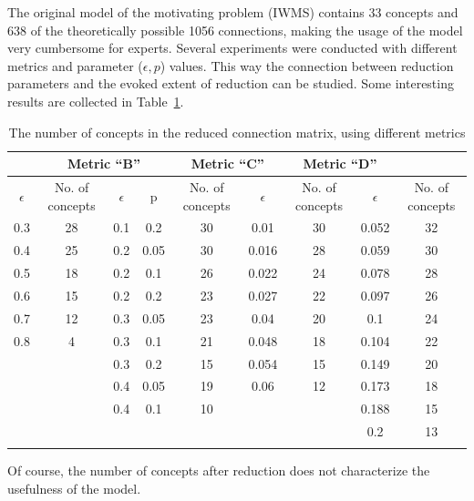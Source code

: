 \documentclass[graybox]{svmult}
\begin{document}
The original model of the motivating problem (IWMS) contains 33 
concepts and 638 of the theoretically possible 1056 connections, making 
the usage of the model very cumbersome for experts. Several experiments 
were conducted with different metrics and parameter ($\epsilon, p$) 
values. This way the connection between reduction parameters and the 
evoked extent of reduction can be studied. Some interesting results are 
collected in Table~\ref{tab:reductionResults}.

\begin{table}[!t]
\caption{The number of concepts in the reduced connection matrix, using different 
metrics \cite{hatwagnerm.f.koczyl.t.2015}}
\label{tab:reductionResults}
\centering
\begin{tabular}{ccccccccc}
\hline\noalign{\smallskip}
\multicolumn{2}{c}{Metric ``A''} &
  \multicolumn{3}{c}{Metric ``B''} &
  \multicolumn{2}{c}{Metric ``C''} &
  \multicolumn{2}{c}{Metric ``D''} \\
\hline\noalign{\smallskip}
$\epsilon$ & No. of concepts &
  $\epsilon$ & p & No. of concepts &
  $\epsilon$ & No. of concepts &
  $\epsilon$ & No. of concepts \\
\noalign{\smallskip}\svhline\noalign{\smallskip}
0.3 & 28 &
  0.1 & 0.2 & 30 &
  0.01 & 30 &
  0.052 & 32 \\
0.4 & 25 &
  0.2 & 0.05 & 30 &
  0.016 & 28 &
  0.059 & 30 \\
0.5 & 18 &
  0.2 & 0.1 & 26 &
  0.022 & 24 &
  0.078 & 28 \\
0.6 & 15 &
  0.2 & 0.2 & 23 &
  0.027 & 22 &
  0.097 & 26 \\
0.7 & 12 &
  0.3 & 0.05 & 23 &
  0.04 & 20 &
  0.1 & 24 \\
0.8 & 4 &
  0.3 & 0.1 & 21 &
  0.048 & 18 &
  0.104 & 22 \\
\multicolumn{2}{c}{} & 
  0.3 & 0.2 & 15 &
  0.054 & 15 &
  0.149 & 20 \\
\multicolumn{2}{c}{} & 
  0.4 & 0.05 & 19 &
  0.06 & 12 &
  0.173 & 18 \\
\multicolumn{2}{c}{} & 
  0.4 & 0.1 & 10 &
  \multicolumn{2}{c}{} &
  0.188 & 15 \\
\multicolumn{2}{c}{} &
  \multicolumn{3}{c}{} &
  \multicolumn{2}{c}{} &
  0.2 & 13 \\
\noalign{\smallskip}\hline\noalign{\smallskip}
\end{tabular}
\end{table}

Of course, the number of concepts after reduction does not characterize 
the usefulness of the model. 
\end{document}

